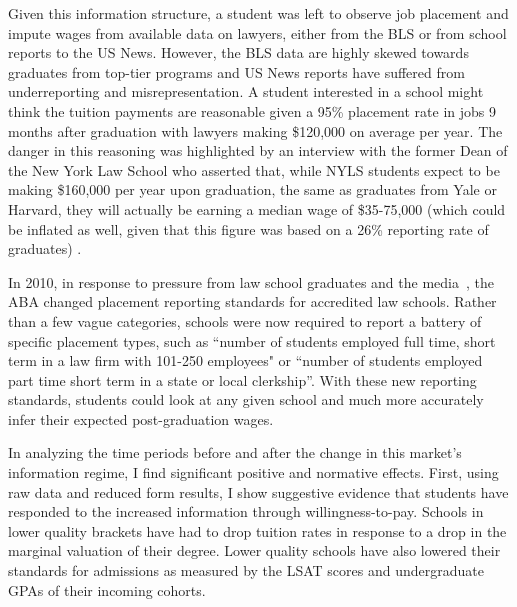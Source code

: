 \documentclass[12pt]{article}
\theoremstyle{definition}
\begin{document}
Given this information structure, a student was left to observe job placement and impute wages from available data on lawyers, either from the BLS or from school reports to the US News. However, the BLS data are highly skewed towards graduates from top-tier programs and US News reports have suffered from underreporting and misrepresentation. A student interested in a school might think the tuition payments are reasonable given a 95\% placement rate in jobs 9 months after graduation with lawyers making \$120,000 on average per year. The danger in this reasoning was highlighted by an interview with the former Dean of the New York Law School who asserted that, while NYLS students expect to be making \$160,000 per year upon graduation, the same as graduates from Yale or Harvard, they will actually be earning a median wage of \$35-75,000 (which could be inflated as well, given that this figure was based on a 26\% reporting rate of graduates) \cite{Segal_econ}.

In 2010, in response to pressure from law school graduates and the media~\cite{Segal}, the ABA changed placement reporting standards for accredited law schools. Rather than a few vague categories, schools were now required to report a battery of specific placement types, such as ``number of students employed full time, short term in a law firm with 101-250 employees" or ``number of students employed part time short term in a state or local clerkship''. With these new reporting standards, students could look at any given school and much more accurately infer their expected post-graduation wages.


In analyzing the time periods before and after the change in this market's information regime, I find significant positive and normative effects. First, using raw data and reduced form results, I show suggestive evidence that students have responded to the increased information through willingness-to-pay. Schools in lower quality brackets have had to drop tuition rates in response to a drop in the marginal valuation of their degree. Lower quality schools have also lowered their standards for admissions as measured by the LSAT scores and undergraduate GPAs of their incoming cohorts.
\end{document}
